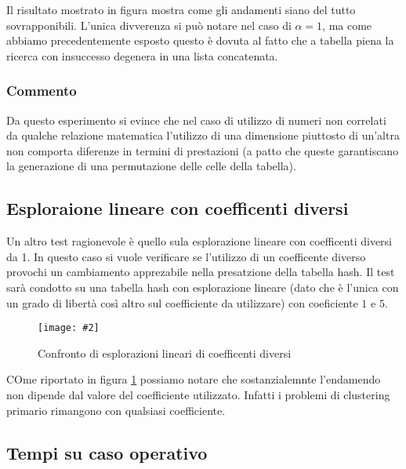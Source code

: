 \documentclass{article}
\newcommand{\image}[3][1]{
	\centering
	\texttt{[image: \#2]}
	\caption{#3}
}
\begin{document}
Il risultato mostrato in figura mostra come gli andamenti siano del tutto sovrapponibili. L'unica divverenza si può notare nel caso di $\alpha = 1$, ma come abbiamo precedentemente esposto questo è dovuta al fatto che a tabella piena la ricerca con insuccesso degenera in una lista concatenata.

\subsubsection{Commento}
Da questo esperimento si evince che nel caso di utilizzo di numeri non correlati da qualche relazione matematica l'utilizzo di una dimensione piuttosto di un'altra non comporta diferenze in termini di prestazioni (a patto che queste garantiscano la generazione di una permutazione delle celle della tabella).

\subsection{Esploraione lineare con coefficenti diversi}
Un altro test ragionevole è quello sula esplorazione lineare con coefficenti diversi da 1. In questo caso si vuole verificare se l'utilizzo di un coefficente diverso provochi un cambiamento apprezabile nella presatzione della tabella hash. Il test sarà condotto su una tabella hash con esplorazione lineare (dato che è l'unica con un grado di libertà così altro sul coefficiente da utilizzare) con coeficiente $1$ e $5$.

\begin{figure}[H]
\image[0.75]{Successo_Confronto_Lineare_c1_c5_scala_logaritmica}{Confronto di esplorazioni lineari di coefficenti diversi}
\label{fig:Confronto_coefficienti}
\end{figure}

COme riportato in figura \ref{fig:Confronto_coefficienti} possiamo notare che sostanzialemnte l'endamendo non dipende dal valore del coefficiente utilizzato. Infatti i problemi di clustering primario rimangono con qualsiasi coefficiente.

\subsection{Tempi su caso operativo}
\end{document}
